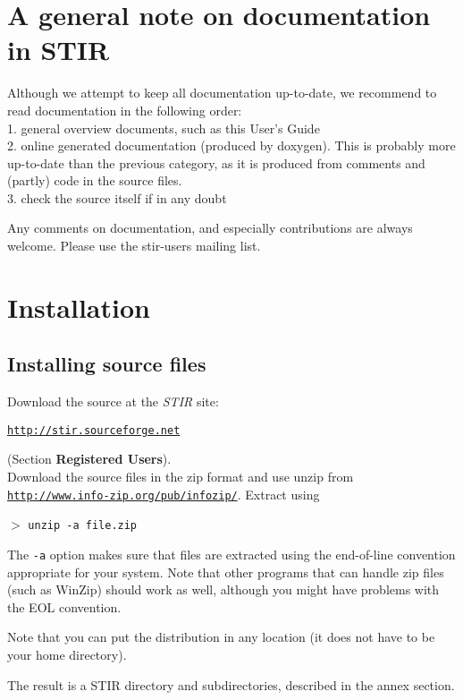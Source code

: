 \documentclass{article}
\def\R2Lurl#1#2{\mbox{\href{#1}{\tt #2}}}
\newcommand{\tab}{\hspace{5mm}}
\newcommand{\cmdline}[1]{\par \noindent $>$ \texttt{#1}\par}
\begin{document}
\section{
A general note on documentation in STIR}

Although we attempt to keep all documentation up-to-date, we 
recommend to read documentation in the following order:\\
1.\tab 
general overview documents, such as this User's Guide\\
2.\tab 
online generated documentation (produced by doxygen). This is 
probably more up-to-date than the previous category, as it is 
produced from comments and (partly) code in the source files.\\
3.\tab 
check the source itself if in any doubt


Any comments on documentation, and especially contributions are 
always welcome. Please use the stir-users mailing list.

\section{
Installation}

\subsection{
Installing source files}

Download the source at the \textit{STIR} site: 
\begin{center}
\R2Lurl{http://stir.sourceforge.net }{http://stir.sourceforge.net} 
\end{center}
\noindent (Section \textbf{Registered Users}).\\
Download the source files in the zip format and use unzip from \\
\R2Lurl{http://www.info-zip.org/pub/infozip/}{http://www.info-zip.org/pub/infozip/}. 
Extract using
\cmdline{unzip -a file.zip}


The \texttt{-a} option makes sure that files are extracted using the 
end-of-line convention appropriate for your system. Note that 
other programs that can handle zip files (such as WinZip) should 
work as well, although you might have problems with the EOL convention.


Note that you can put the distribution in any location (it does 
not have to be your home directory).


The result is a STIR directory and subdirectories, described 
in the annex section.
\end{document}
